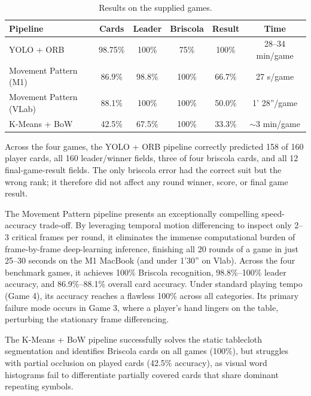 \documentclass[11pt,a4paper]{article}
\begin{document}
\begin{table}[h]
    \centering
    {\small
    \setlength{\tabcolsep}{1.8pt}
    \begin{tabular}{lccccc}
            \hline
            Pipeline & Cards & Leader & Briscola & Result & Time \\
            \hline
            YOLO + ORB & 98.75\% & 100\% & 75\% & 100\% & 28--34 min/game \\
            Movement Pattern (M1) & 86.9\% & 98.8\% & 100\% & 66.7\% & 27 s/game \\
            Movement Pattern (VLab) & 88.1\% & 100\% & 100\% & 50.0\% & 1' 28''/game \\
            K-Means + BoW & 42.5\% & 67.5\% & 100\% & 33.3\% & $\sim$3 min/game \\
            \hline
        \end{tabular}\par}
    \caption{Results on the supplied games.}
    \label{tab:results}
\end{table}

Across the four games, the YOLO + ORB pipeline correctly predicted 158 of 160 player
cards, all 160 leader/winner fields, three of four briscola cards, and all 12
final-game-result fields. The only briscola error had the correct suit but the
wrong rank; it therefore did not affect any round winner, score, or final game
result.

The Movement Pattern pipeline presents an exceptionally compelling speed-accuracy
trade-off. By leveraging temporal motion differencing to inspect only 2--3 critical
frames per round, it eliminates the immense computational burden of frame-by-frame
deep-learning inference, finishing all 20 rounds of a game in just 25--30 seconds on
the M1 MacBook (and under 1'30'' on Vlab). Across the four benchmark games, it
achieves 100\% Briscola recognition, 98.8\%--100\% leader accuracy, and
86.9\%--88.1\% overall card accuracy. Under standard playing tempo (Game 4), its
accuracy reaches a flawless 100\% across all categories. Its primary failure mode
occurs in Game 3, where a player's hand lingers on the table, perturbing the
stationary frame differencing.

The K-Means + BoW pipeline successfully solves the static tablecloth segmentation
and identifies Briscola cards on all games (100\%), but struggles with partial
occlusion on played cards (42.5\% accuracy), as visual word histograms fail to
differentiate partially covered cards that share dominant repeating symbols.
\end{document}
